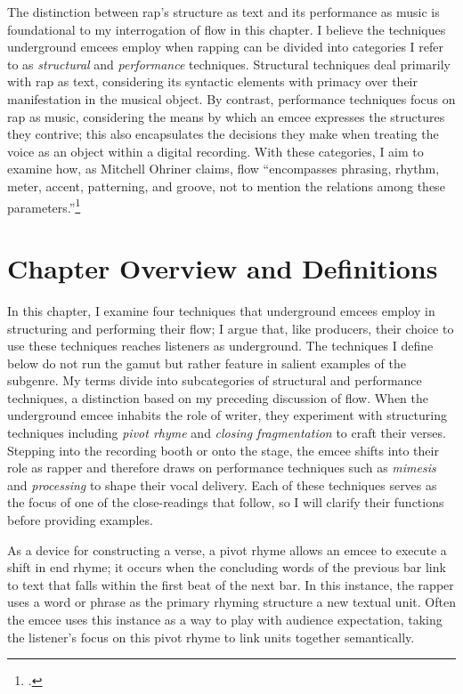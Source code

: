 The distinction between rap's structure as text and its performance as music is foundational
to my interrogation of flow in this chapter. I believe the techniques underground emcees employ 
when rapping can be divided into  categories I refer to as \emph{structural} and \emph{performance}
techniques. Structural techniques deal primarily with rap as text, considering its syntactic 
elements with primacy over their manifestation in the musical object. By contrast, performance
techniques focus on rap as music, considering the means by which an emcee expresses the structures
they contrive; this also encapsulates the decisions they make when treating the voice as an object
within a digital recording. With these categories, I aim to examine how, as Mitchell Ohriner claims,
flow ``encompasses phrasing, rhythm, meter, accent, patterning, and groove, not to mention the 
relations among these parameters.''\footnote{
    \autocite[28]{mitchellohrinerFlowRhythmicVoice2019}.}

\section{Chapter Overview and Definitions}

In this chapter, I examine four techniques that underground emcees employ in structuring and
performing their flow; I argue that, like producers, their choice to use these techniques reaches
listeners as underground. The techniques I define below do not run the gamut but rather feature in
salient examples of the subgenre. My terms divide into subcategories of structural and performance
techniques, a distinction based on my preceding discussion of flow. When the underground emcee 
inhabits the role of writer, they experiment with structuring techniques including \emph{pivot rhyme}
and \emph{closing fragmentation} to craft their verses. Stepping into the recording booth or onto 
the stage, the emcee shifts into their role as rapper and therefore draws on performance techniques
such as \emph{mimesis} and \emph{processing} to shape their vocal delivery. Each of these techniques
serves as the focus of one of the close-readings that follow, so I will clarify their functions 
before providing examples.

As a device for constructing a verse, a pivot rhyme allows an emcee to execute a shift in end rhyme;
it occurs when the concluding words of the previous bar link to text that falls within the first beat
of the next bar. In this instance, the rapper uses a word or phrase as the primary rhyming structure
a new textual unit. Often the emcee uses this instance as a way to play with audience expectation, 
taking the listener's focus on this pivot rhyme to link units together semantically.


